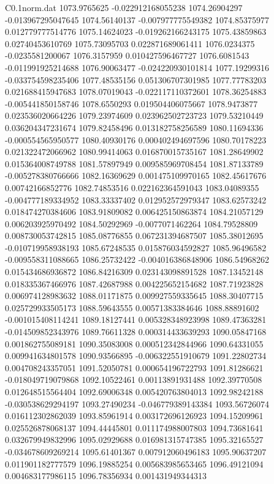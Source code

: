 \begin{filecontents}{C0.1norm.dat}
1073.9765625		-0.022912168055238
1074.26904297		-0.013967295047645
1074.56140137		-0.007977775549382
1074.85375977		0.012779777514776
1075.14624023		-0.019262166243175
1075.43859863		0.02740453610769
1075.73095703		0.022871689061411
1076.0234375		-0.0235581200067
1076.3157959		0.010427596467727
1076.6081543		-0.011991925214688
1076.90063477		-0.024220930101814
1077.19299316		-0.033754598235406
1077.48535156		0.051306707301985
1077.77783203		0.021688415947683
1078.07019043		-0.022117110372601
1078.36254883		-0.005441850158746
1078.6550293		0.019504406075667
1078.9473877		0.023536020664226
1079.23974609		0.023962502723723
1079.53210449		0.036204347231674
1079.82458496		0.013182758256589
1080.11694336		-0.000554565950577
1080.40930176		0.000402494697596
1080.70178223		0.021322472066962
1080.99414063		0.016870015735167
1081.28649902		0.015364008749788
1081.57897949		0.009585969708454
1081.87133789		-0.005278380766666
1082.16369629		0.001475109970165
1082.45617676		0.00742166852776
1082.74853516		0.022162364591043
1083.04089355		-0.004777189334952
1083.33337402		0.012952572979347
1083.62573242		0.018474270384606
1083.91809082		0.006425150863874
1084.21057129		0.006203925970492
1084.50292969		-0.0077071462264
1084.79528809		0.008730053742815
1085.08776855		0.067231394687507
1085.38012695		-0.010719958938193
1085.67248535		0.015876034592827
1085.96496582		-0.009558311088665
1086.25732422		-0.004016386848906
1086.54968262		0.015434686936872
1086.84216309		0.023143098891528
1087.13452148		0.018335367466976
1087.42687988		0.004225652154682
1087.71923828		0.006974128983632
1088.01171875		0.009927559335645
1088.30407715		0.025729933505173
1088.59643555		0.00571383384646
1088.88891602		-0.001015408114241
1089.18127441		0.005328348923998
1089.47363281		-0.014509852343976
1089.76611328		0.000314433639293
1090.05847168		0.001862755089181
1090.35083008		0.000512342844966
1090.64331055		0.009941634801578
1090.93566895		-0.006322551910679
1091.22802734		0.004708243357051
1091.52050781		0.000654196722793
1091.81286621		-0.018049719079868
1092.10522461		0.00113891931488
1092.39770508		0.012648515564404
1092.69006348		0.005420763804013
1092.98242188		-0.030538629294197
1093.27490234		-0.046779389143384
1093.56726074		0.016112302862039
1093.85961914		0.003172696126923
1094.15209961		0.025526878068137
1094.44445801		0.011174988007803
1094.73681641		0.032679949832996
1095.02929688		0.016981315747385
1095.32165527		-0.034678609269214
1095.61401367		0.007912060496183
1095.90637207		0.011901182777579
1096.19885254		0.005683985653465
1096.49121094		0.004683177986115
1096.78356934		0.001431949344313

\end{filecontents}
